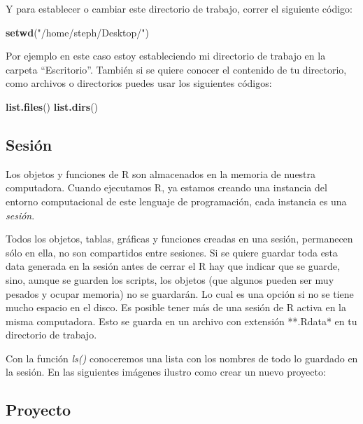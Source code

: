 \documentclass[
]{book}
\newenvironment{Shaded}{\begin{snugshade}}{\end{snugshade}}
\newcommand{\FunctionTok}[1]{\textcolor[rgb]{0.13,0.29,0.53}{\textbf{#1}}}
\newcommand{\NormalTok}[1]{#1}
\newcommand{\StringTok}[1]{\textcolor[rgb]{0.31,0.60,0.02}{#1}}
\begin{document}
Y para establecer o cambiar este directorio de trabajo, correr el siguiente código:

\begin{Shaded}
\begin{Highlighting}[]
\FunctionTok{setwd}\NormalTok{(}\StringTok{"/home/steph/Desktop/"}\NormalTok{)}
\end{Highlighting}
\end{Shaded}

Por ejemplo en este caso estoy estableciendo mi directorio de trabajo en la carpeta ``Escritorio''.
También si se quiere conocer el contenido de tu directorio, como archivos o directorios puedes usar los siguientes códigos:

\begin{Shaded}
\begin{Highlighting}[]
\FunctionTok{list.files}\NormalTok{()}
\FunctionTok{list.dirs}\NormalTok{()}
\end{Highlighting}
\end{Shaded}

\subsection{Sesión}\label{sesiuxf3n}

Los objetos y funciones de R son almacenados en la memoria de nuestra computadora.
Cuando ejecutamos R, ya estamos creando una instancia del entorno computacional de este lenguaje de programación, cada instancia es una \emph{sesión}.

Todos los objetos, tablas, gráficas y funciones creadas en una sesión, permanecen sólo en ella, no son compartidos entre sesiones.
Si se quiere guardar toda esta data generada en la sesión antes de cerrar el R hay que indicar que se guarde, sino, aunque se guarden los scripts, los objetos (que algunos pueden ser muy pesados y ocupar memoria) no se guardarán.
Lo cual es una opción si no se tiene mucho espacio en el disco.
Es posible tener más de una sesión de R activa en la misma computadora.
Esto se guarda en un archivo con extensión **.Rdata* en tu directorio de trabajo.

Con la función \emph{ls()} conoceremos una lista con los nombres de todo lo guardado en la sesión.
En las siguientes imágenes ilustro como crear un nuevo proyecto:

\subsection{Proyecto}\label{proyecto}
\end{document}
